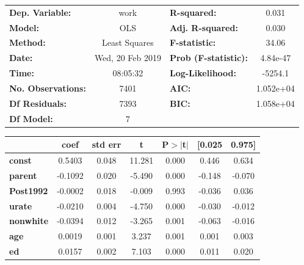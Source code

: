 \documentclass{article}
\begin{document}
\begin{enumerate}[label=\alph*]
\begin{center}
\begin{tabular}{lclc}
\toprule
\textbf{Dep. Variable:}    &       work       & \textbf{  R-squared:         } &     0.031   \\
\textbf{Model:}            &       OLS        & \textbf{  Adj. R-squared:    } &     0.030   \\
\textbf{Method:}           &  Least Squares   & \textbf{  F-statistic:       } &     34.06   \\
\textbf{Date:}             & Wed, 20 Feb 2019 & \textbf{  Prob (F-statistic):} &  4.84e-47   \\
\textbf{Time:}             &     08:05:32     & \textbf{  Log-Likelihood:    } &   -5254.1   \\
\textbf{No. Observations:} &        7401      & \textbf{  AIC:               } & 1.052e+04   \\
\textbf{Df Residuals:}     &        7393      & \textbf{  BIC:               } & 1.058e+04   \\
\textbf{Df Model:}         &           7      & \textbf{                     } &             \\
\bottomrule
\end{tabular}
\begin{tabular}{lcccccc}
                  & \textbf{coef} & \textbf{std err} & \textbf{t} & \textbf{P$>$$|$t$|$} & \textbf{[0.025} & \textbf{0.975]}  \\
\midrule
\textbf{const}    &       0.5403  &        0.048     &    11.281  &         0.000        &        0.446    &        0.634     \\
\textbf{parent}   &      -0.1092  &        0.020     &    -5.490  &         0.000        &       -0.148    &       -0.070     \\
\textbf{Post1992} &      -0.0002  &        0.018     &    -0.009  &         0.993        &       -0.036    &        0.036     \\
\textbf{urate}    &      -0.0210  &        0.004     &    -4.750  &         0.000        &       -0.030    &       -0.012     \\
\textbf{nonwhite} &      -0.0394  &        0.012     &    -3.265  &         0.001        &       -0.063    &       -0.016     \\
\textbf{age}      &       0.0019  &        0.001     &     3.237  &         0.001        &        0.001    &        0.003     \\
\textbf{ed}       &       0.0157  &        0.002     &     7.103  &         0.000        &        0.011    &        0.020     \\

\end{tabular}
\end{center}
\end{enumerate}
\end{document}

